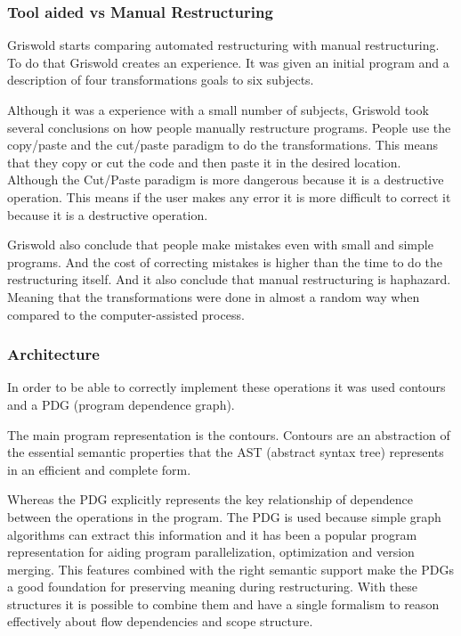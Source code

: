 \subsubsection{Tool aided vs Manual Restructuring}
Griswold starts comparing automated restructuring with manual restructuring. 
To do that Griswold creates an experience.
It was given an initial program and a description of four transformations goals to six subjects.%

Although it was a experience with a small number of subjects, Griswold took several conclusions on how people manually restructure programs.
People use the copy/paste and the cut/paste paradigm to do the transformations. 
This means that they copy or cut the code and then paste it in the desired location.
Although the Cut/Paste paradigm is more dangerous because it is a destructive operation. 
This means if the user makes any error it is more difficult to correct it because it is a destructive operation.

Griswold also conclude that people make mistakes even with small and simple programs. 
And the cost of correcting mistakes is higher than the time to do the restructuring itself. 
And it also conclude that manual restructuring is haphazard. 
Meaning that the transformations were done in almost a random way when compared to the computer-assisted process.


\subsubsection{Architecture}

In order to be able to correctly implement these operations it was used contours and a PDG (program dependence graph).

The main program representation is the contours. 
Contours are an abstraction of the essential semantic properties that the AST (abstract syntax tree) represents in an efficient and complete form.

Whereas the PDG explicitly represents the key relationship of dependence between the operations in the program. 
The PDG is used because simple graph algorithms can extract this information and it has been a popular program representation for aiding program parallelization, optimization and version merging.
This features combined with the right semantic support make the PDGs a good foundation for preserving meaning during restructuring.
With these structures it is possible to combine them and have a single formalism to reason effectively about flow dependencies and scope structure.

